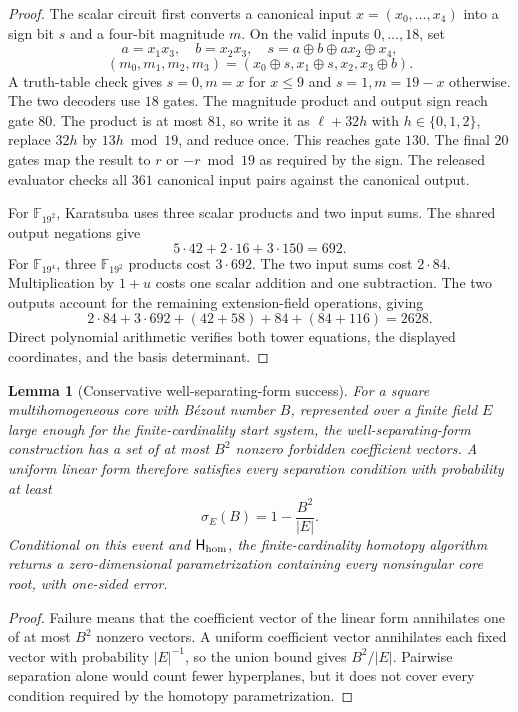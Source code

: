 \documentclass[11pt]{article}
\newtheorem{lemma}[theorem]{Lemma}
\newcommand{\F}{\mathbb F}
\begin{document}
\begin{proof}
The scalar circuit first converts a canonical input
$x=(x_0,\ldots,x_4)$ into a sign bit $s$ and a four-bit magnitude $m$.  On
the valid inputs $0,\ldots,18$, set
\[
 a=x_1x_3,\quad b=x_2x_3,\quad
 s=a\oplus b\oplus ax_2\oplus x_4,
\]
\[
 (m_0,m_1,m_2,m_3)
 =(x_0\oplus s,x_1\oplus s,x_2,x_3\oplus b).
\]
A truth-table check gives $s=0,m=x$ for $x\le9$ and $s=1,m=19-x$ otherwise.
The two decoders use $18$ gates.  The magnitude product and output sign reach
gate $80$.  The product is at most $81$, so write it as $\ell+32h$ with
$h\in\{0,1,2\}$, replace $32h$ by $13h\bmod19$, and reduce once.  This reaches
gate $130$.  The final $20$ gates map the result to $r$ or $-r\bmod19$ as
required by the sign.  The released evaluator checks all $361$ canonical
input pairs against the canonical output.

For $\F_{19^2}$, Karatsuba uses three scalar products and two input sums.  The
shared output negations give
\[
 5\cdot42+2\cdot16+3\cdot150=692.
\]
For $\F_{19^4}$, three $\F_{19^2}$ products cost $3\cdot692$.  The two input
sums cost $2\cdot84$.  Multiplication by $1+u$ costs one scalar addition and
one subtraction.  The two outputs account for the remaining extension-field
operations, giving
\[
 2\cdot84+3\cdot692+(42+58)+84+(84+116)=2628.
\]
Direct polynomial arithmetic verifies both tower equations, the displayed
coordinates, and the basis determinant.
\end{proof}

\begin{lemma}[Conservative well-separating-form success]
\label{lem:sq-separator}
For a square multihomogeneous core with B\'ezout number $B$, represented over a
finite field $E$ large enough for the finite-cardinality start system, the
well-separating-form construction has a set of at most $B^2$ nonzero forbidden
coefficient vectors.  A uniform linear form therefore satisfies every
separation condition with probability at least
\[
 \sigma_E(B)=1-\frac{B^2}{|E|}.
\]
Conditional on this event and $\mathsf H_{\rm hom}$, the finite-cardinality
homotopy algorithm returns a zero-dimensional parametrization containing every
nonsingular core root, with one-sided error.
\end{lemma}

\begin{proof}
Failure means that the coefficient vector of the linear form annihilates one
of at most $B^2$ nonzero vectors.  A uniform coefficient vector annihilates
each fixed vector with probability $|E|^{-1}$, so the union bound gives
$B^2/|E|$.  Pairwise separation alone would count fewer hyperplanes, but it
does not cover every condition required by the homotopy parametrization.
\end{proof}
\end{document}
